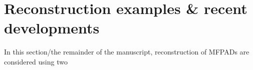 \section{Reconstruction examples & recent developments}

In this section/the remainder of the manuscript, reconstruction of MFPADs are considered using two 